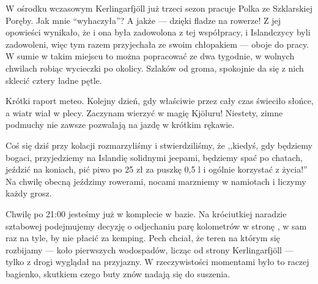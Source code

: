 W ośrodku wczasowym Kerlingarfjöll już trzeci sezon pracuje Polka ze Szklarskiej Poręby. Jak mnie “wyhaczyła”? A jakże --- dzięki fladze na rowerze! Z jej opowieści wynikało, że i ona była zadowolona z tej współpracy, i Islandczycy byli zadowoleni, więc tym razem przyjechała ze swoim chłopakiem --- oboje do pracy. W sumie w takim miejscu to można popracować ze dwa tygodnie, w wolnych chwilach robiąc wycieczki po okolicy. Szlaków od groma, spokojnie da się z nich sklecić cztery ładne pętle.


Krótki raport meteo. Kolejny dzień, gdy właściwie przez cały czas świeciło słońce, a wiatr wiał w plecy. Zaczynam wierzyć w magię Kjöluru! Niestety, zimne podmuchy nie zawsze pozwalają na jazdę w krótkim rękawie.

Coś się dziś przy kolacji rozmarzyliśmy i stwierdziliśmy, że ,,kiedyś, gdy będziemy bogaci, przyjedziemy na Islandię solidnymi jeepami, będziemy spać po chatach, jeździć na koniach, pić piwo po 25 zł za puszkę 0,5 l i ogólnie korzystać z życia!'' Na chwilę obecną jeździmy rowerami, nocami marzniemy w namiotach i liczymy każdy grosz.

Chwilę po 21:00 jesteśmy już w komplecie w bazie. Na króciutkiej naradzie sztabowej podejmujemy decyzję o odjechaniu parę kolometrów w stronę , w sam raz na tyle, by nie płacić za kemping. Pech chciał, że teren na którym się rozbijamy --- koło pierwszych wodospadów, licząc od strony Kerlingarfjöll --- tylko z drogi wyglądał na przyjazny. W rzeczywistości momentami było to raczej bagienko, skutkiem czego buty znów nadają się do suszenia.

